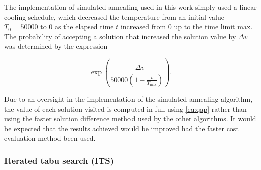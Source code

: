 {{{        The implementation of simulated annealing used in this work simply used a linear cooling schedule, which decreased the temperature from an initial value \(T_0 = 50000\) to 0 as the elapsed time \(t\) increased from 0 up to the time limit \(\text{max}\).
        The probability of accepting a solution that increased the solution value by \(\Delta{v}\) was determined by the expression

        \[
            \operatorname{exp}\left({\frac{-\Delta{v}}{50000(1 - \frac{t}{T_\text{max}})}}\right).
        \]

        Due to an oversight in the implementation of the simulated annealing algorithm, the value of each solution visited is computed in full using \eqref{eq:qap} rather than using the faster solution difference method used by the other algorithms.
        It would be expected that the results achieved would be improved had the faster cost evaluation method been used.
    }

    \subsubsection{Iterated tabu search (ITS) \citep{Misevicius:2012dj}} {
    \label{sec:method-its}

}}}
